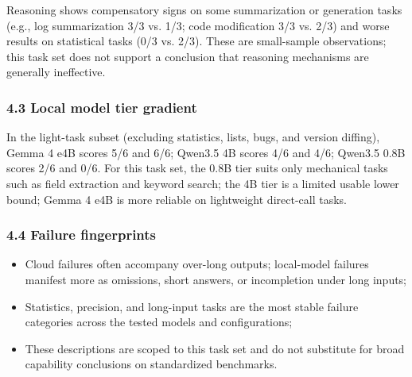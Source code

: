\documentclass[
]{article}
\begin{document}
Reasoning shows compensatory signs on some summarization or generation tasks (e.g., log summarization 3/3 vs. 1/3; code modification 3/3 vs. 2/3) and worse results on statistical tasks (0/3 vs. 2/3). These are small-sample observations; this task set does not support a conclusion that reasoning mechanisms are generally ineffective.

\subsubsection{4.3 Local model tier gradient}
\begin{table}[ht]
\centering
\small
{}
\caption{Model tier gradient (no-think, majority).}
\label{tab:tier}
\end{table}

In the light-task subset (excluding statistics, lists, bugs, and version diffing), Gemma 4 e4B scores 5/6 and 6/6; Qwen3.5 4B scores 4/6 and 4/6; Qwen3.5 0.8B scores 2/6 and 0/6. For this task set, the 0.8B tier suits only mechanical tasks such as field extraction and keyword search; the 4B tier is a limited usable lower bound; Gemma 4 e4B is more reliable on lightweight direct-call tasks.

\subsubsection{4.4 Failure fingerprints}
\begin{itemize}
\item Cloud failures often accompany over-long outputs; local-model failures manifest more as omissions, short answers, or incompletion under long inputs;
\item Statistics, precision, and long-input tasks are the most stable failure categories across the tested models and configurations;
\item These descriptions are scoped to this task set and do not substitute for broad capability conclusions on standardized benchmarks.
\end{itemize}
\end{document}
